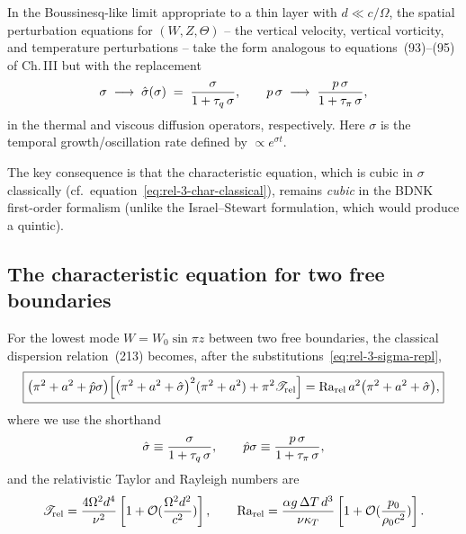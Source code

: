 In the Boussinesq-like limit appropriate to a thin layer with
$d \ll c/\Omega$, the spatial perturbation equations for
$(W, Z, \Theta)$ -- the vertical velocity, vertical vorticity, and
temperature perturbations -- take the form analogous to
equations~(93)--(95) of Ch.\,III but with the replacement
\begin{equation}\label{eq:rel-3-sigma-repl}
  \sigma \;\longrightarrow\; \hat{\sigma}(\sigma)
  \;=\; \frac{\sigma}{1 + \tau_{q}\,\sigma}, \qquad
  p\,\sigma \;\longrightarrow\;
  \frac{p\,\sigma}{1 + \tau_{\pi}\,\sigma},
\end{equation}
in the thermal and viscous diffusion operators, respectively.
Here $\sigma$ is the temporal growth/oscillation rate defined by
$\propto e^{\sigma t}$.

The key consequence is that the characteristic equation, which is
cubic in $\sigma$ classically (cf.\ equation~\eqref{eq:rel-3-char-classical}),
remains \emph{cubic} in the BDNK first-order formalism (unlike the
Israel--Stewart formulation, which would produce a quintic).

\subsection{The characteristic equation for two free boundaries}

For the lowest mode $W = W_{0}\sin\pi z$ between two free boundaries,
the classical dispersion relation~(213) becomes, after the
substitutions~\eqref{eq:rel-3-sigma-repl},
\begin{equation}\label{eq:rel-3-char-IS}
\boxed{
  \bigl(\pi^{2}+a^{2}+\hat{p}\sigma\bigr)
  \Bigl[
    \bigl(\pi^{2}+a^{2}+\hat{\sigma}\bigr)^{2}
    (\pi^{2}+a^{2})
    + \pi^{2}\mathscr{T}_{\mathrm{rel}}
  \Bigr]
  = \mathrm{Ra}_{\mathrm{rel}}\,a^{2}\bigl(\pi^{2}+a^{2}+\hat{\sigma}\bigr),
}
\end{equation}
where we use the shorthand
\begin{equation}\label{eq:rel-3-hatsigma-def}
  \hat{\sigma} \equiv \frac{\sigma}{1+\tau_{q}\,\sigma}, \qquad
  \hat{p}\sigma \equiv \frac{p\,\sigma}{1+\tau_{\pi}\,\sigma},
\end{equation}
and the relativistic Taylor and Rayleigh numbers are
\begin{equation}\label{eq:rel-3-TaRa}
  \mathscr{T}_{\mathrm{rel}}
  = \frac{4\Omega^{2}d^{4}}{\nu^{2}}
    \left[1 + \mathcal{O}(\frac{\Omega^{2}d^{2}}{c^{2}})\right],
  \qquad
  \mathrm{Ra}_{\mathrm{rel}}
  = \frac{\alpha g\,\Delta T\,d^{3}}{\nu\kappa_{T}}
    \left[1 + \mathcal{O}(\frac{p_0}{\rho_0 c^{2}})\right].
\end{equation}

